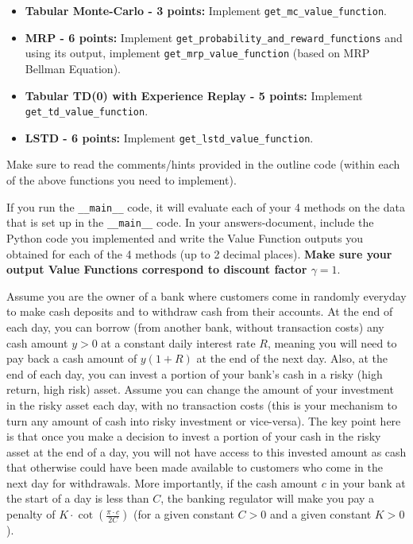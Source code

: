 \documentclass[12pt]{exam}
\begin{document}
\begin{questions}
\begin{itemize}
\item {\bf Tabular Monte-Carlo - 3 points: } Implement \lstinline{get_mc_value_function}.
\item {\bf MRP - 6 points: } Implement \lstinline{get_probability_and_reward_functions} and using its output, implement \lstinline{get_mrp_value_function} (based on MRP Bellman Equation).
\item {\bf Tabular TD(0) with Experience Replay - 5 points: } Implement \lstinline{get_td_value_function}.
\item {\bf LSTD - 6 points: } Implement \lstinline{get_lstd_value_function}.
\end{itemize}

Make sure to read the comments/hints provided in the outline code (within each of the above functions you need to implement).

If you run the \lstinline{__main__} code, it will evaluate each of your 4 methods on the data that is set up in the \lstinline{__main__} code. In your answers-document, include the Python code you implemented and write the Value Function outputs you obtained for each of the 4 methods (up to 2 decimal places). {\bf Make sure your output Value Functions correspond to discount factor $\gamma = 1$}.

\vspace{10mm}


\question Assume you are the owner of a bank where customers come in randomly everyday to make cash deposits and to withdraw cash from their accounts. At the end of each day, you can borrow (from another bank, without transaction costs) any cash amount $y > 0$ at a constant daily interest rate $R$, meaning you will need to pay back a cash amount of $y(1+R)$ at the end of the next day. Also, at the end of each day, you can invest a portion of your bank's cash in a risky (high return, high risk) asset. Assume you can change the amount of your investment in the risky asset each day, with no transaction costs (this is your mechanism to turn any amount of cash into risky investment or vice-versa). The key point here is that once you make a decision to invest a portion of your cash in the risky asset at the end of a day, you will not have access to this invested amount as cash that otherwise could have been made available to customers who come in the next day for withdrawals. More importantly, if the cash amount $c$ in your bank at the start of a day is less than $C$, the banking regulator will make you pay a penalty of $K \cdot \cot(\frac {\pi \cdot c}{2C})$ (for a given constant $C > 0$ and a given constant $K > 0$).


\end{questions}
\end{document}
